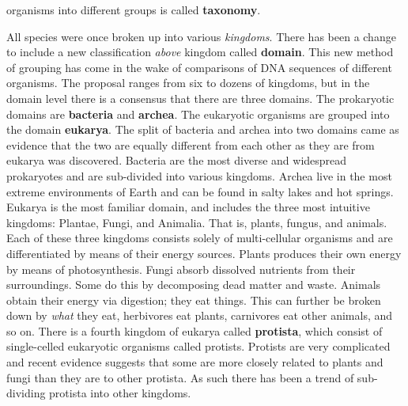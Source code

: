\documentclass[crop=false,class=book,oneside]{standalone}
\begin{document}
        organisms into different groups is called
        \textbf{taxonomy}.
        \par\hfill\par
        All species were once broken up into various
        \textit{kingdoms}. There has been a change to
        include a new classification \textit{above}
        kingdom called \textbf{domain}. This new method
        of grouping has come in the wake of comparisons
        of DNA sequences of different organisms. The
        proposal ranges from six to dozens of kingdoms,
        but in the domain level there is a consensus that
        there are three domains. The prokaryotic domains
        are \textbf{bacteria} and
        \textbf{archea}. The eukaryotic organisms are
        grouped into the domain
        \textbf{eukarya}. The split of bacteria and archea
        into two domains came as evidence that the two
        are equally different from each other as they are
        from eukarya was discovered. Bacteria are the most
        diverse and widespread prokaryotes and are
        sub-divided into various kingdoms.
        Archea live in the most extreme environments of
        Earth and can be found in salty lakes and hot
        springs. Eukarya is the most familiar domain, and
        includes the three most intuitive kingdoms:
        Plantae, Fungi, and Animalia. That is,
        plants, fungus, and animals. Each of these three
        kingdoms consists solely of multi-cellular
        organisms and are differentiated by means of their
        energy sources. Plants produces their own energy
        by means of photosynthesis. Fungi absorb
        dissolved nutrients from their surroundings.
        Some do this by decomposing dead matter and
        waste. Animals obtain their energy via
        digestion; they eat things. This can further be
        broken down by \textit{what} they eat,
        herbivores eat plants, carnivores eat other animals,
        and so on. There is a fourth kingdom of
        eukarya called \textbf{protista}, which
        consist of single-celled eukaryotic organisms
        called protists. Protists are very complicated and
        recent evidence suggests that some are more closely
        related to plants and fungi than they are to
        other protista. As such there has been a trend
        of sub-dividing protista into other kingdoms.
\end{document}
